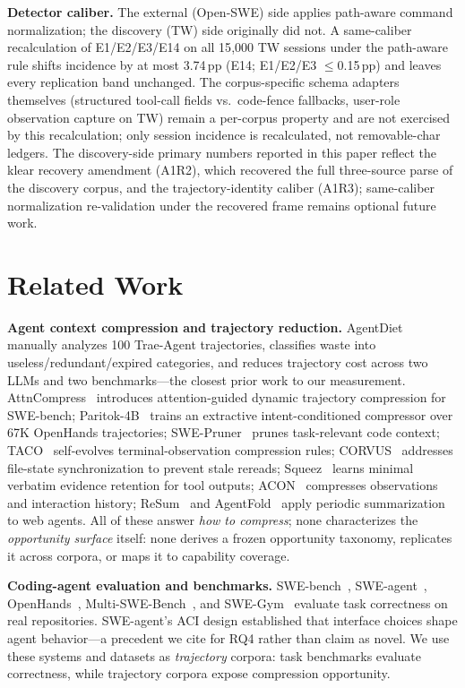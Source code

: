 ﻿\documentclass[sigconf,balance=false]{acmart}
\begin{document}
\textbf{Detector caliber.} The external (Open-SWE) side applies path-aware command normalization; the discovery (TW) side originally did not. A same-caliber recalculation of E1/E2/E3/E14 on all 15{,}000 TW sessions under the path-aware rule shifts incidence by at most 3.74\,pp (E14; E1/E2/E3 $\leq$0.15\,pp) and leaves every replication band unchanged. The corpus-specific schema adapters themselves (structured tool-call fields vs.\ code-fence fallbacks, user-role observation capture on TW) remain a per-corpus property and are not exercised by this recalculation; only session incidence is recalculated, not removable-char ledgers. The discovery-side primary numbers reported in this paper reflect the klear recovery amendment (A1R2), which recovered the full three-source parse of the discovery corpus, and the trajectory-identity caliber (A1R3); same-caliber normalization re-validation under the recovered frame remains optional future work.

\section{Related Work}

\textbf{Agent context compression and trajectory reduction.} AgentDiet~\cite{agentdiet2026} manually analyzes 100 Trae-Agent trajectories, classifies waste into useless/redundant/expired categories, and reduces trajectory cost across two LLMs and two benchmarks---the closest prior work to our measurement. AttnCompress~\cite{attncompress2026} introduces attention-guided dynamic trajectory compression for SWE-bench; Paritok-4B~\cite{paritok4b2026} trains an extractive intent-conditioned compressor over 67K OpenHands trajectories; SWE-Pruner~\cite{swepruner2026} prunes task-relevant code context; TACO~\cite{taco2026} self-evolves terminal-observation compression rules; CORVUS~\cite{corvus2026} addresses file-state synchronization to prevent stale rereads; Squeez~\cite{squeez2026} learns minimal verbatim evidence retention for tool outputs; ACON~\cite{acon2026} compresses observations and interaction history; ReSum~\cite{resume2025} and AgentFold~\cite{agentfold2025} apply periodic summarization to web agents. All of these answer \emph{how to compress}; none characterizes the \emph{opportunity surface} itself: none derives a frozen opportunity taxonomy, replicates it across corpora, or maps it to capability coverage.

\textbf{Coding-agent evaluation and benchmarks.} SWE-bench~\cite{swebench2024}, SWE-agent~\cite{sweagent2024}, OpenHands~\cite{openhands2024}, Multi-SWE-Bench~\cite{multiswebench2026}, and SWE-Gym~\cite{swegym2025} evaluate task correctness on real repositories. SWE-agent's ACI design established that interface choices shape agent behavior---a precedent we cite for RQ4 rather than claim as novel. We use these systems and datasets as \emph{trajectory} corpora: task benchmarks evaluate correctness, while trajectory corpora expose compression opportunity.
\end{document}
